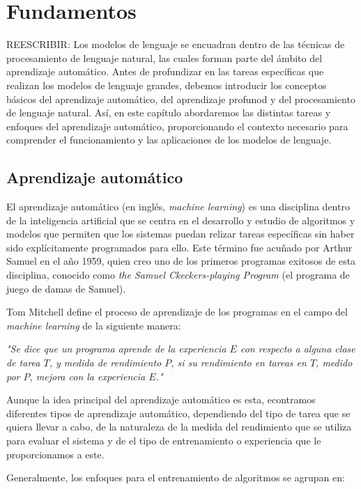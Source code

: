 \documentclass[11pt,spanish,listoffigures,listoftables]{tfgetsinf}
\begin{document}
\chapter{Fundamentos}\label{capitulo:fundamentos}

REESCRIBIR: Los modelos de lenguaje se encuadran dentro de las técnicas de procesamiento de lenguaje natural, las cuales forman parte del ámbito del aprendizaje automático. Antes de profundizar en las tareas específicas que realizan los modelos de lenguaje grandes, debemos introducir los conceptos básicos del aprendizaje automático, del aprendizaje profunod y del procesamiento de lenguaje natural. Así, en este capítulo abordaremos las distintas tareas y enfoques del aprendizaje automático, proporcionando el contexto necesario para comprender el funcionamiento y las aplicaciones de los modelos de lenguaje.

\section{Aprendizaje automático}

El aprendizaje automático (en inglés, \textit{machine learning}) es una disciplina dentro de la inteligencia artificial que se centra en el desarrollo y estudio de algoritmos y modelos que permiten que los sistemas puedan relizar tareas específicas sin haber sido explícitamente programados para ello. Este término fue acuñado por Arthur Samuel en el año 1959, quien creo uno de los primeros programas exitosos de esta disciplina, conocido como \textit{the Samuel Ckeckers-playing Program} \cite{samuelCheckers} (el programa de juego de damas de Samuel).

Tom Mitchell \cite{mitchell1997mcgraw} define el proceso de aprendizaje de los programas en el campo del \textit{machine learning} de la siguiente manera:

\textit{"Se dice que un programa aprende de la experiencia $E$ con respecto a alguna clase de tarea $T$, y medida de rendimiento $P$, si su rendimiento en tareas en $T$, medido por $P$, mejora con la experiencia $E$."}

Aunque la idea principal del aprendizaje automático es esta, econtramos diferentes tipos de aprendizaje automático, dependiendo del tipo de tarea que se quiera llevar a cabo, de la naturaleza de la medida del rendimiento que se utiliza para evaluar el sistema y de el tipo de entrenamiento o experiencia que le proporcionamos a este.

Generalmente, los enfoques para el entrenamiento de algoritmos se agrupan en:
\end{document}
